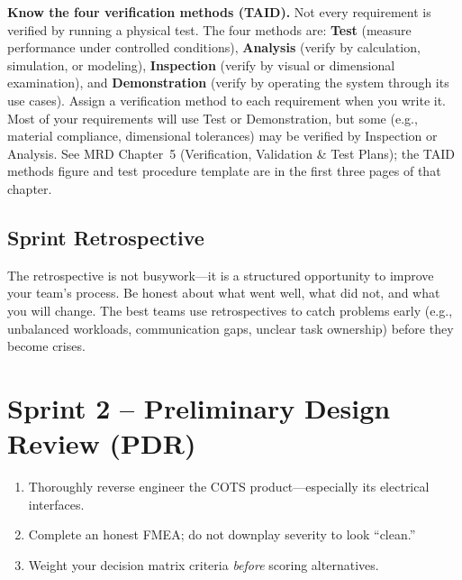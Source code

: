 \documentclass[11pt,letterpaper]{article}
\begin{document}
\begin{tipbox}
\textbf{Know the four verification methods (TAID).} Not every requirement is verified by running a physical test. The four methods are: \textbf{Test} (measure performance under controlled conditions), \textbf{Analysis} (verify by calculation, simulation, or modeling), \textbf{Inspection} (verify by visual or dimensional examination), and \textbf{Demonstration} (verify by operating the system through its use cases). Assign a verification method to each requirement when you write it. Most of your requirements will use Test or Demonstration, but some (e.g., material compliance, dimensional tolerances) may be verified by Inspection or Analysis. See MRD Chapter~5 (Verification, Validation \& Test Plans); the TAID methods figure and test procedure template are in the first three pages of that chapter.
\end{tipbox}

\subsection{Sprint Retrospective}

\begin{faqbox}
The retrospective is not busywork---it is a structured opportunity to improve your team's process. Be honest about what went well, what did not, and what you will change. The best teams use retrospectives to catch problems early (e.g., unbalanced workloads, communication gaps, unclear task ownership) before they become crises.
\end{faqbox}

\section{Sprint 2 -- Preliminary Design Review (PDR)}

\begin{priorities}
\begin{enumerate}[leftmargin=*, itemsep=1pt, topsep=0pt]
    \item Thoroughly reverse engineer the COTS product---especially its electrical interfaces.
    \item Complete an honest FMEA; do not downplay severity to look ``clean.''
    \item Weight your decision matrix criteria \textit{before} scoring alternatives.
\end{enumerate}
\end{priorities}
\end{document}
